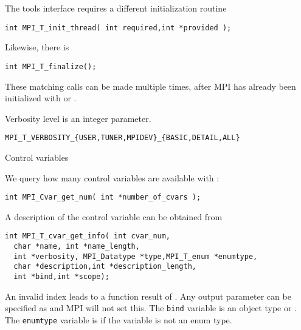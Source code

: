 
\begin{mpifour}

The tools interface requires a different initialization routine
\begin{lstlisting}
int MPI_T_init_thread( int required,int *provided );
\end{lstlisting}
Likewise, there is 
\begin{lstlisting}
int MPI_T_finalize();
\end{lstlisting}
These matching calls can be made multiple times,
after MPI has already been initialized with
 or .

Verbosity level is an integer parameter.
\begin{verbatim}
MPI_T_VERBOSITY_{USER,TUNER,MPIDEV}_{BASIC,DETAIL,ALL}
\end{verbatim}

 {Control variables}
\label{sec:mpit-cvar}

We query how many control variables are available
with :
\begin{lstlisting}
int MPI_Cvar_get_num( int *number_of_cvars );
\end{lstlisting}
A description of the control variable can be obtained
from 
\begin{lstlisting}
int MPI_T_cvar_get_info( int cvar_num,
  char *name, int *name_length,
  int *verbosity, MPI_Datatype *type,MPI_T_enum *enumtype,
  char *description,int *description_length,
  int *bind,int *scope);
\end{lstlisting}
An invalid index leads to a function result of .
%
Any output parameter can be specified as 
and MPI will not set this.
%
The \lstinline{bind} variable is an object type or .
%
The \lstinline{enumtype} variable is  if the variable
is not an enum type.


\end{mpifour}

